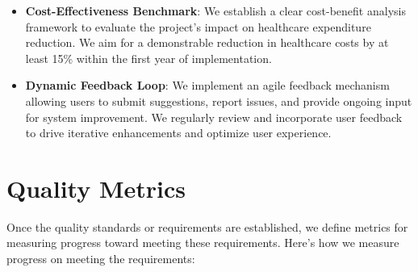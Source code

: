 \begin{itemize}
    \item \textbf{Cost-Effectiveness Benchmark}: We establish a clear cost-benefit analysis framework to evaluate the project's impact on healthcare expenditure reduction. We aim for a demonstrable reduction in healthcare costs by at least 15\% within the first year of implementation.
    \item \textbf{Dynamic Feedback Loop}: We implement an agile feedback mechanism allowing users to submit suggestions, report issues, and provide ongoing input for system improvement. We regularly review and incorporate user feedback to drive iterative enhancements and optimize user experience.
\end{itemize}

\section{Quality Metrics}

Once the quality standards or requirements are established, we define metrics for measuring progress toward meeting these requirements. Here's how we measure progress on meeting the requirements:

